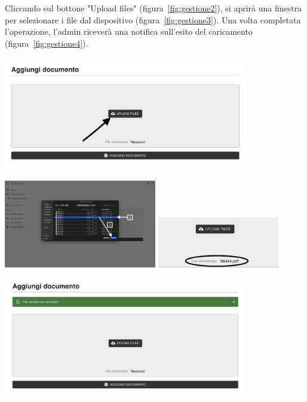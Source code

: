 Cliccando sul bottone "Upload files" (figura~\ref{fig:gestione2}), si aprirà una finestra per selezionare i file dal dispositivo (figura~\ref{fig:gestione3}). Una volta completata l'operazione, l'admin riceverà una notifica sull'esito del caricamento (figura~\ref{fig:gestione4}).

\begin{center}
    \includegraphics[width=0.8\textwidth]{./img/PaginaGestioneDocumenti2.png}
    \label{fig:gestione2}
\end{center}

\newpage

\begin{center}
    \includegraphics[width=0.5\textwidth]{./img/PaginaGestioneDocumenti3.png}
    \hspace{0.05\textwidth}
    \includegraphics[width=0.4\textwidth]{./img/GestioneDocumenti4.png}
    \label{fig:gestione3}
\end{center}

\begin{center}
    \includegraphics[width=0.8\textwidth]{./img/GestioneDocumenti5.png}
    \label{fig:gestione4}
\end{center}
